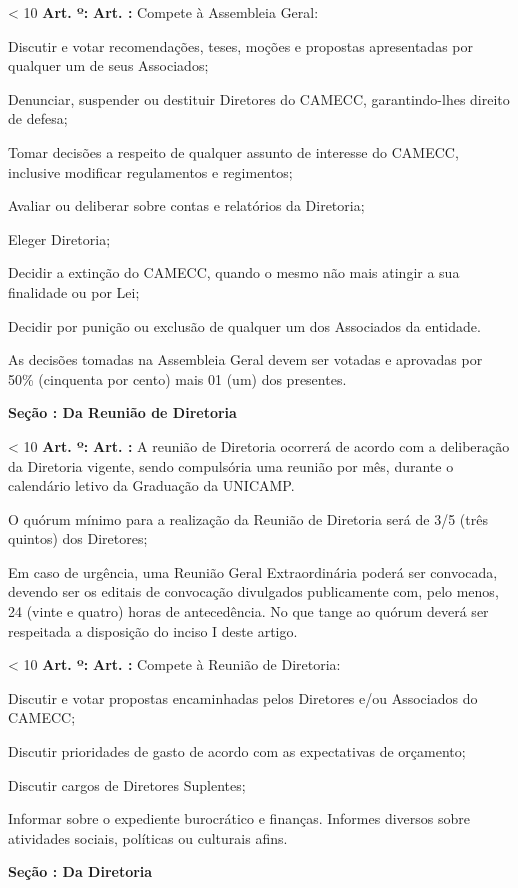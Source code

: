 \documentclass[capitulo]{br-lex}
\newcounter{tit}
\newcounter{sec}
\newcounter{art}
\newcommand{\secao}[1]{
    \vspace{20pt}
    \textbf{Seção \Roman{sec}: #1}
    \stepcounter{sec}
}
\renewcommand{\artigo}{
    \ifnum\value{art} < 10
        \textbf{Art. \arabic{art}º:}
    \else
        \textbf{Art. \arabic{art}:}
    \fi
    \stepcounter{art}
    \setcounter{inciso}{0}
    \setcounter{paragrafo}{0}
}
\begin{document}
\artigo Compete à Assembleia Geral:

\inciso Discutir e votar recomendações, teses, moções e propostas apresentadas por qualquer um de seus Associados;

\inciso Denunciar, suspender ou destituir Diretores do CAMECC, garantindo-lhes direito de defesa;

\inciso Tomar decisões a respeito de qualquer assunto de interesse do CAMECC, inclusive modificar regulamentos e regimentos;

\inciso Avaliar ou deliberar sobre contas e relatórios da Diretoria;

\inciso Eleger Diretoria;

\inciso Decidir a extinção do CAMECC, quando o mesmo não mais atingir a sua finalidade ou por Lei;

\inciso Decidir por punição ou exclusão de qualquer um dos Associados da entidade.

\paragrafounico As decisões tomadas na Assembleia Geral devem ser votadas e aprovadas por 50\% (cinquenta por cento) mais 01 (um) dos presentes.

\secao{Da Reunião de Diretoria}

\artigo A reunião de Diretoria ocorrerá de acordo com a deliberação da Diretoria vigente, sendo compulsória uma reunião por mês, durante o calendário letivo da Graduação da UNICAMP.

\inciso O quórum mínimo para a realização da Reunião de Diretoria será de 3/5 (três quintos) dos Diretores;

\inciso Em caso de urgência, uma Reunião Geral Extraordinária poderá ser convocada, devendo ser os editais de convocação divulgados publicamente com, pelo menos, 24 (vinte e quatro) horas de antecedência. No que tange ao quórum deverá ser respeitada a disposição do inciso I deste artigo.

\artigo Compete à Reunião de Diretoria:

\inciso Discutir e votar propostas encaminhadas pelos Diretores e/ou Associados do CAMECC;

\inciso Discutir prioridades de gasto de acordo com as expectativas de orçamento;

\inciso Discutir cargos de Diretores Suplentes;

\inciso Informar sobre o expediente burocrático e finanças. Informes diversos sobre atividades sociais, políticas ou culturais afins.

\secao{Da Diretoria}
\end{document}
